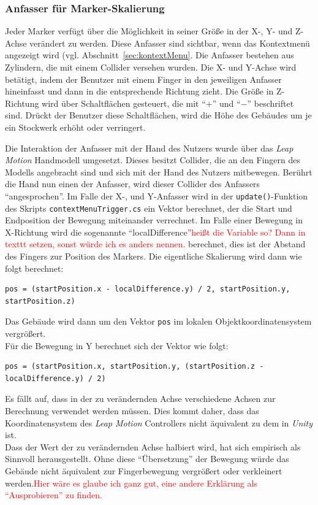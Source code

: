 \subsubsection{Anfasser für Marker-Skalierung}\label{sec:markerHandles}
Jeder Marker verfügt über die Möglichkeit in seiner Größe in der X-, Y- und Z-Achse verändert zu werden. Diese Anfasser sind sichtbar, wenn das Kontextmenü angezeigt wird (vgl. Abschnitt~\ref{sec:kontextMenu}. Die Anfasser bestehen aus Zylindern, die mit einem Collider versehen wurden. Die X- und Y-Achse wird betätigt, indem der Benutzer mit einem Finger in den jeweiligen Anfasser hineinfasst und dann in die entsprechende Richtung zieht. Die Größe in Z-Richtung wird über Schaltflächen gesteuert, die mit "`$+$"' und "`$-$"' beschriftet sind. Drückt der Benutzer diese Schaltflächen, wird die Höhe des Gebäudes um je ein Stockwerk erhöht oder verringert.

Die Interaktion der Anfasser mit der Hand des Nutzers wurde über das \emph{Leap Motion} Handmodell umgesetzt. Dieses besitzt Collider, die an den Fingern des Modells angebracht sind und sich mit der Hand des Nutzers mitbewegen. Berührt die Hand nun einen der Anfasser, wird dieser Collider des Anfassers "`angesprochen"'. Im Falle der X-, und Y-Anfasser wird in der \texttt{update()}-Funktion des Skripts \texttt{contextMenuTrigger.cs} ein Vektor berechnet, der die Start und Endposition der Bewegung miteinander verrechnet. Im Falle einer Bewegung in X-Richtung wird die sogenannte "`localDifference"'\textcolor{red}{heißt die Variable so? Dann in texttt setzen, sonst würde ich es anders nennen.} berechnet, dies ist der Abstand des Fingers zur Position des Markers. Die eigentliche Skalierung wird dann wie folgt berechnet:

 \begin{lstlisting}
pos = (startPosition.x - localDifference.y) / 2, startPosition.y, startPosition.z)
 \end{lstlisting}

Das Gebäude wird dann um den Vektor \texttt{pos} im lokalen Objektkoordinatensystem vergrößert.\\
Für die Bewegung in Y berechnet sich der Vektor wie folgt:

 \begin{lstlisting}
pos = (startPosition.x, startPosition.y, (startPosition.z - localDifference.y) / 2)
 \end{lstlisting}

Es fällt auf, dass in der zu verändernden Achse verschiedene Achsen zur Berechnung verwendet werden müssen. Dies kommt daher, dass das Koordinatensystem des \emph{Leap Motion} Controllers nicht äquivalent zu dem in \emph{Unity} ist.\\
Dass der Wert der zu verändernden Achse halbiert wird, hat sich empirisch als Sinnvoll herausgestellt. Ohne diese "`Übersetzung"' der Bewegung würde das Gebäude nicht äquivalent zur Fingerbewegung vergrößert oder verkleinert werden.\textcolor{red}{Hier wäre es glaube ich ganz gut, eine andere Erklärung als "`Ausprobieren"' zu finden.}

